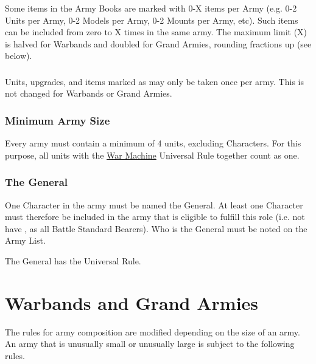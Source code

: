 Some items in the Army Books are marked with 0-X items per Army (e.g. 0-2 Units per Army, 0-2 Models per Army, 0-2 Mounts per Army, etc). Such items can be included from zero to X times in the same army. The maximum limit (X) is halved for Warbands and doubled for Grand Armies, rounding fractions up (see below).

\subsubsection{\oneofakind}

Units, upgrades, and items marked as \oneofakind{} may only be taken once per army. This is not changed for Warbands or Grand Armies.

\subsubsection{Minimum Army Size}

Every army must contain a minimum of 4 units, excluding Characters. For this purpose, all units with the \hyperref[war_machine]{War Machine} Universal Rule together count as one.

\subsubsection{The General}
\label{the_general}

One Character in the army must be named the General. At least one Character must therefore be included in the army that is eligible to fulfill this role (i.e. not have \hyperref[not_a_leader]{\notaleader}, as all Battle Standard Bearers). Who is the General must be noted on the Army List.

The General has the \hyperref[commanding_presence]{\commandingpresence} Universal Rule.

\section{Warbands and Grand Armies}
\label{warbands_and_grand_armies}

The rules for army composition are modified depending on the size of an army. An army that is unusually small or unusually large is subject to the following rules.

